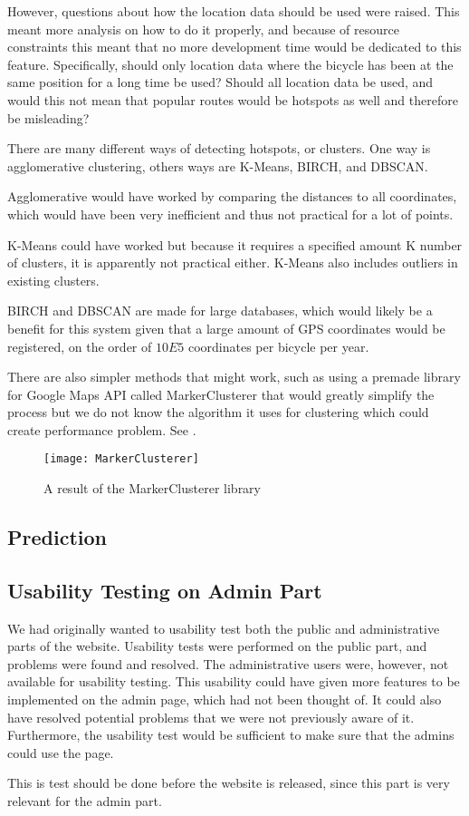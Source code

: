 However, questions about how the location data should be used were raised.
This meant more analysis on how to do it properly, and because of resource constraints this meant that no more development time would be dedicated to this feature. 
Specifically, should only location data where the bicycle has been at the same position for a long time be used? 
Should all location data be used, and would this not mean that popular routes would be hotspots as well and therefore be misleading? 

There are many different ways of detecting hotspots, or clusters. One way is agglomerative clustering, others ways are K-Means, BIRCH, and DBSCAN.

Agglomerative would have worked by comparing the distances to all coordinates, which would have been very inefficient and thus not practical for a lot of points. 

K-Means could have worked but because it requires a specified amount K number of clusters, it is apparently not practical either. K-Means also includes outliers in existing clusters.

BIRCH and DBSCAN are made for large databases, which would likely be a benefit for this system given that a large amount of GPS coordinates would be registered, on the order of $10E5$ coordinates per bicycle per year. 

There are also simpler methods that might work, such as using a premade library for Google Maps API called MarkerClusterer that would greatly simplify the process but we do not know the algorithm it uses for clustering which could create performance problem. See .

\begin{figure}[h]
\begin{center}
\texttt{[image: MarkerClusterer]}
\caption{A result of the MarkerClusterer library}
\label{fig:markerclusterer}
\end{center}
\end{figure}

\subsection{Prediction}\label{subsec:prediction}

\subsection{Usability Testing on Admin Part}
We had originally wanted to usability test both the public and administrative parts of the website.
Usability tests were performed on the public part, and problems were found and resolved. 
The administrative users were, however, not available for usability testing.
This usability could have given more features to be implemented on the admin page, which had not been thought of.
It could also have resolved potential problems that we were not previously aware of it.
Furthermore, the usability test would be sufficient to make sure that the admins could use the page.

This is test should be done before the website is released, since this part is very relevant for the admin part.